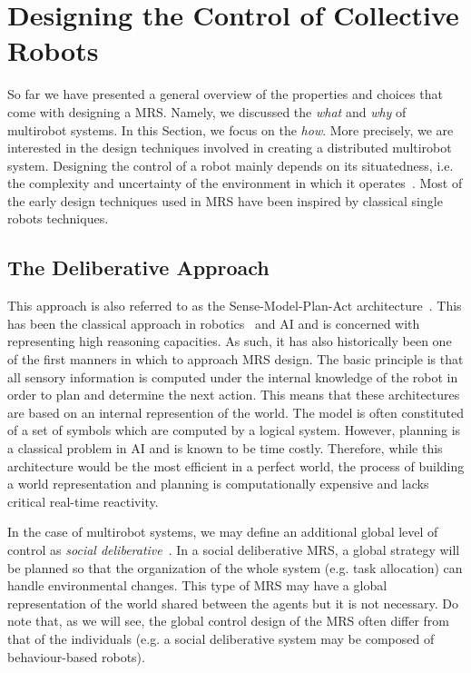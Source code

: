 

\section{Designing the Control of Collective Robots}

  So far we have presented a general overview of the properties and choices that come with designing a MRS. Namely, we discussed the \emph{what} and \emph{why} of multirobot systems. In this Section, we focus on the \emph{how}. More precisely, we are interested in the design techniques involved in creating a distributed multirobot system. Designing the control of a robot mainly depends on its situatedness, i.e. the complexity and uncertainty of the environment in which it operates~\parencite{Mataric2008}. Most of the early design techniques used in MRS have been inspired by classical single robots techniques.

  \subsection{The Deliberative Approach}

    This approach is also referred to as the Sense-Model-Plan-Act architecture~\parencite{Albus1991, Iocchi2001, Mataric2008}. This has been the classical approach in robotics~\parencite{Nilsson1984} and AI and is concerned with representing high reasoning capacities. As such, it has also historically been one of the first manners in which to approach MRS design. The basic principle is that all sensory information is computed under the internal knowledge of the robot in order to plan and determine the next action. This means that these architectures are based on an internal represention of the world. The model is often constituted of a set of symbols which are computed by a logical system. However, planning is a classical problem in AI and is known to be time costly. Therefore, while this architecture would be the most efficient in a perfect world, the process of building a world representation and planning is computationally expensive and lacks critical real-time reactivity.

    In the case of multirobot systems, we may define an additional global level of control as \emph{social deliberative}~\parencite{Iocchi2001}. In a social deliberative MRS, a global strategy will be planned so that the organization of the whole system (e.g. task allocation) can handle environmental changes. This type of MRS may have a global representation of the world shared between the agents but it is not necessary. Do note that, as we will see, the global control design of the MRS often differ from that of the individuals (e.g. a social deliberative system may be composed of behaviour-based robots).

